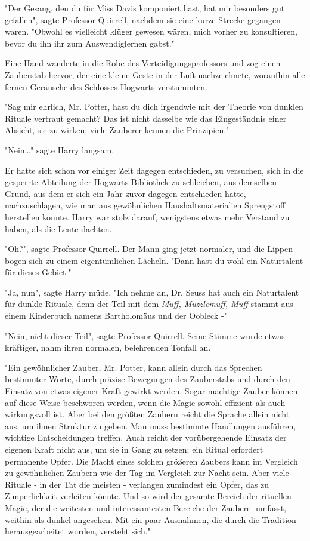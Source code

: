 {"Der Gesang, den du für Miss Davis komponiert hast, hat mir besonders gut gefallen", sagte Professor Quirrell, nachdem sie eine kurze Strecke gegangen waren. "Obwohl es vielleicht klüger gewesen wären, mich vorher zu konsultieren, bevor du ihn ihr zum Auswendiglernen gabst."

Eine Hand wanderte in die Robe des Verteidigungsprofessors und zog einen Zauberstab hervor, der eine kleine Geste in der Luft nachzeichnete, woraufhin alle fernen Geräusche des Schlosses Hogwarts verstummten.

"Sag mir ehrlich, Mr. Potter, hast du dich irgendwie mit der Theorie von dunklen Rituale vertraut gemacht? Das ist nicht dasselbe wie das Eingeständnis einer Absicht, sie zu wirken; viele Zauberer kennen die Prinzipien."

"Nein…" sagte Harry langsam.

Er hatte sich schon vor einiger Zeit dagegen entschieden, zu versuchen, sich in die gesperrte Abteilung der Hogwarts-Bibliothek zu schleichen, aus demselben Grund, aus dem er sich ein Jahr zuvor dagegen entschieden hatte, nachzuschlagen, wie man aus gewöhnlichen Haushaltsmaterialien Sprengstoff herstellen konnte. Harry war stolz darauf, wenigstens etwas mehr Verstand zu haben, als die Leute dachten.

"Oh?", sagte Professor Quirrell. Der Mann ging jetzt normaler, und die Lippen bogen sich zu einem eigentümlichen Lächeln. "Dann hast du wohl ein Naturtalent für dieses Gebiet."

"Ja, nun", sagte Harry müde. "Ich nehme an, Dr. Seuss hat auch ein Naturtalent für dunkle Rituale, denn der Teil mit dem \emph{Muff, Muzzlemuff, Muff} stammt aus einem Kinderbuch namens Bartholomäus und der Oobleck -"

"Nein, nicht dieser Teil", sagte Professor Quirrell. Seine Stimme wurde etwas kräftiger, nahm ihren normalen, belehrenden Tonfall an.

"Ein gewöhnlicher Zauber, Mr. Potter, kann allein durch das Sprechen bestimmter Worte, durch präzise Bewegungen des Zauberstabs und durch den Einsatz von etwas eigener Kraft gewirkt werden. Sogar mächtige Zauber können auf diese Weise beschworen werden, wenn die Magie sowohl effizient als auch wirkungsvoll ist. Aber bei den größten Zaubern reicht die Sprache allein nicht aus, um ihnen Struktur zu geben. Man muss bestimmte Handlungen ausführen, wichtige Entscheidungen treffen. Auch reicht der vorübergehende Einsatz der eigenen Kraft nicht aus, um sie in Gang zu setzen; ein Ritual erfordert permanente Opfer. Die Macht eines solchen größeren Zaubers kann im Vergleich zu gewöhnlichen Zaubern wie der Tag im Vergleich zur Nacht sein. Aber viele Rituale - in der Tat die meisten - verlangen zumindest ein Opfer, das zu Zimperlichkeit verleiten könnte. Und so wird der gesamte Bereich der rituellen Magie, der die weitesten und interessantesten Bereiche der Zauberei umfasst, weithin als dunkel angesehen. Mit ein paar Ausnahmen, die durch die Tradition herausgearbeitet wurden, versteht sich."

}
